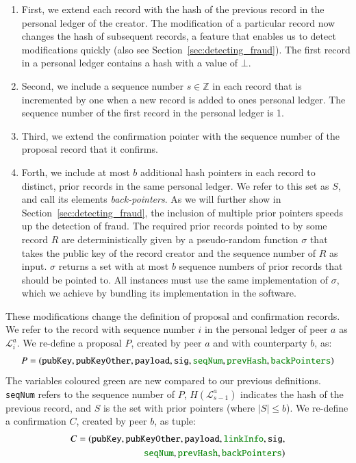 \begin{enumerate}
	\item First, we extend each record with the hash of the previous record in the personal ledger of the creator.
	The modification of a particular record now changes the hash of subsequent records, a feature that enables us to detect modifications quickly (also see Section~\ref{sec:detecting_fraud}).
	The first record in a personal ledger contains a hash with a value of $ \bot $.
	\item Second, we include a sequence number $ s \in \mathbb{Z} $ in each record that is incremented by one when a new record is added to ones personal ledger.
	The sequence number of the first record in the personal ledger is 1.
	\item Third, we extend the confirmation pointer with the sequence number of the proposal record that it confirms.
	\item Forth, we include at most $ b $ additional hash pointers in each record to distinct, prior records in the same personal ledger.
	We refer to this set as $ S $, and call its elements \emph{back-pointers}.
	As we will further show in Section~\ref{sec:detecting_fraud}, the inclusion of multiple prior pointers speeds up the detection of fraud.
	The required prior records pointed to by some record $ R $ are deterministically given by a pseudo-random function $ \sigma $ that takes the public key of the record creator and the sequence number of $ R $ as input.
	$ \sigma $ returns a set with at most $ b $ sequence numbers of prior records that should be pointed to.
	All \ModelName{} instances must use the same implementation of $ \sigma $, which we achieve by bundling its implementation in the \ModelName{} software.
\end{enumerate}

These modifications change the definition of proposal and confirmation records.
We refer to the record with sequence number $ i $ in the personal ledger of peer $ a $ as $ \mathcal{L}_i^a $.
We re-define a proposal $ P $, created by peer $ a $ and with counterparty $ b $, as:
\begin{align*}
	P = (\texttt{pubKey}, \texttt{pubKeyOther}, \texttt{payload}, \texttt{sig}, \textcolor{ao}{\texttt{seqNum}}, \textcolor{ao}{\texttt{prevHash}}, \textcolor{ao}{\texttt{backPointers}})
\end{align*}
The variables coloured green are new compared to our previous definitions.
\texttt{seqNum} refers to the sequence number of $ P $, $ H(\mathcal{L}_{s-1}^a) $ indicates the hash of the previous record, and $ S $ is the set with prior pointers (where $ |S| \leq b $).
We re-define a confirmation $ C $, created by peer $ b $, as tuple:
\begin{align*}
	C = (\texttt{pubKey}, \texttt{pubKeyOther}, \texttt{payload}, \textcolor{ao}{\texttt{linkInfo}}, \texttt{sig},\\
	\textcolor{ao}{\texttt{seqNum}}, \textcolor{ao}{\texttt{prevHash}}, \textcolor{ao}{\texttt{backPointers}})
\end{align*}

